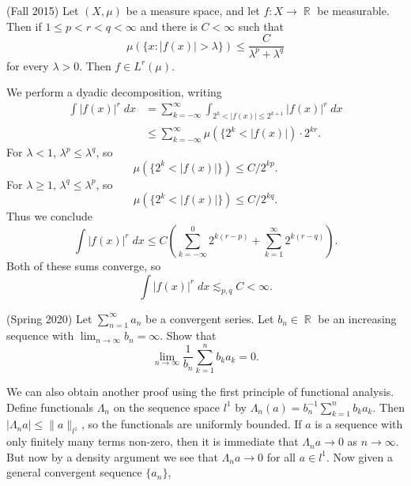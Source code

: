 \documentclass[answers]{exam}
\DeclareMathOperator{\RR}{\mathbb{R}}
\begin{document}
\begin{questions}
\question (Fall 2015) Let $(X, \mu)$ be a measure space, and let $f: X \to \RR$ be measurable. Then if $1 \leq p < r < q < \infty$ and there is $C < \infty$ such that
%
\[ \mu(\{ x : |f(x)| > \lambda \}) \leq \frac{C}{\lambda^p + \lambda^q} \]
%
for every $\lambda > 0$. Then $f \in L^r(\mu)$.
\begin{solution}
    We perform a dyadic decomposition, writing
    \begin{align*}
        \int |f(x)|^r\; dx &= \sum_{k = -\infty}^\infty \int_{2^k < |f(x)| \leq 2^{k+1}} |f(x)|^r\; dx\\
        &\leq \sum_{k = -\infty}^\infty \mu(\{ 2^k < |f(x)|) \cdot 2^{kr}.
    \end{align*}
    For $\lambda < 1$, $\lambda^p \leq \lambda^q$, so
    \[ \mu(\{ 2^k < |f(x)| \}) \leq C/2^{kp}. \]
    For $\lambda \geq 1$, $\lambda^q \leq \lambda^p$, so
    \[ \mu(\{ 2^k < |f(x)| \}) \leq C/2^{kq}. \]
    Thus we conclude
    \[ \int |f(x)|^r\; dx \leq C \left( \sum_{k = -\infty}^0 2^{k(r - p)} + \sum_{k = 1}^\infty 2^{k(r - q)} \right). \]
    Both of these sums converge, so
    \[  \int |f(x)|^r\; dx \lesssim_{p,q} C < \infty. \]
\end{solution}

\question (Spring 2020)
Let $\sum_{n=1}^{\infty}a_{n}$ be a convergent series. Let $b_{n}\in\RR$ be an increasing sequence with $\lim_{n\to\infty}b_{n}=\infty$. Show that
\begin{equation*}
  \lim_{n\to\infty} \frac{1}{b_{n}}\sum_{k=1}^{n}b_{k}a_{k} = 0.
\end{equation*}

\begin{solution}
We can also obtain another proof using the first principle of functional analysis. Define functionals $\Lambda_n$ on the sequence space $l^1$ by $\Lambda_n(a) = b_n^{-1} \sum_{k = 1}^n b_k a_k$. Then $|\Lambda_n a| \leq \| a \|_{l^1}$, so the functionals are uniformly bounded. If $a$ is a sequence with only finitely many terms non-zero, then it is immediate that $\Lambda_n a \to 0$ as $n \to \infty$. But now by a density argument we see that $\Lambda_n a \to 0$ for all $a \in l^1$. Now given a general convergent sequence $\{ a_n \}$,


\end{solution}
\end{questions}
\end{document}

